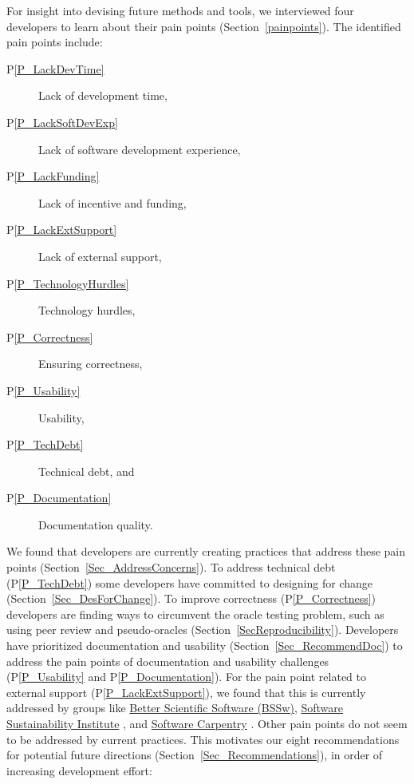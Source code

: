 \documentclass[final, 3p, times, authoryear]{elsarticle}
\newcommand{\ppref}[1]{P\ref{#1}}
\begin{document}
For insight into devising future methods and tools, we interviewed four
developers to learn about their pain points (Section~\ref{painpoints}).  The
identified pain points include: 

\begin{description}
\item [\ppref{P_LackDevTime}] Lack of development time, %
\item [\ppref{P_LackSoftDevExp}] Lack of software development experience, %
\item [\ppref{P_LackFunding}] Lack of incentive and funding, %
\item [\ppref{P_LackExtSupport}] Lack of external support, %
\item [\ppref{P_TechnologyHurdles}] Technology hurdles, %
\item [\ppref{P_Correctness}] Ensuring correctness, %
\item [\ppref{P_Usability}] Usability, %
\item [\ppref{P_TechDebt}] Technical debt, and %
\item [\ppref{P_Documentation}] Documentation quality. %
\end{description}  

We found that developers are currently creating practices that address these
pain points (Section~\ref{Sec_AddressConcerns}).  To address technical debt
(\ppref{P_TechDebt}) some developers have committed to designing for change
(Section~\ref{Sec_DesForChange}). To improve correctness (\ppref{P_Correctness})
developers are finding ways to circumvent the oracle testing problem, such as
using peer review and pseudo-oracles (Section~\ref{SecReproducibility}).
Developers have prioritized documentation and usability
(Section~\ref{Sec_RecommendDoc}) to address the pain points of documentation and
usability challenges (\ppref{P_Usability} and \ppref{P_Documentation}).  For the
pain point related to external support (\ppref{P_LackExtSupport}), we found that
this is currently addressed by groups like \href{https://bssw.io/} {Better
Scientific Software (BSSw)},
\href{https://www.software.ac.uk/} {Software Sustainability Institute}
\citep{CrouchEtAl2013}, and \href{https://software-carpentry.org/}{Software
Carpentry} \citep{WilsonAndLumsdaine2006, Wilson2016}. Other pain points do not
seem to be addressed by current practices.  This motivates our eight
recommendations for potential future directions
(Section~\ref{Sec_Recommendations}), in order of increasing development effort:
\end{document}
